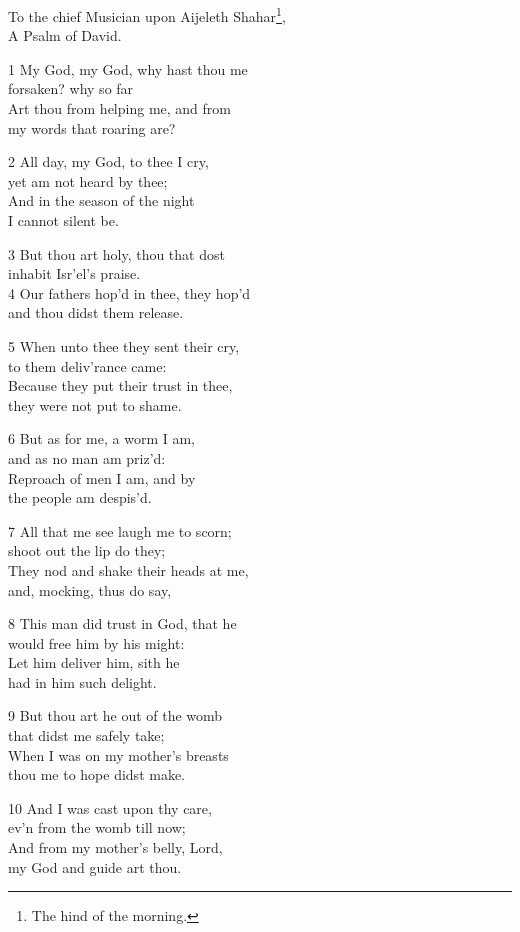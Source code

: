 To the chief Musician upon Aijeleth Shahar\footnote{The hind of the morning.},\\
A Psalm of David.

1 My God, my God, why hast thou me\\
forsaken? why so far\\
Art thou from helping me, and from\\
my words that roaring are?

2 All day, my God, to thee I cry,\\
yet am not heard by thee;\\
And in the season of the night\\
I cannot silent be.

3 But thou art holy, thou that dost\\
inhabit Isr’el’s praise.\\
4 Our fathers hop’d in thee, they hop’d\\
and thou didst them release.

5 When unto thee they sent their cry,\\
to them deliv’rance came:\\
Because they put their trust in thee,\\
they were not put to shame.

6 But as for me, a worm I am,\\
and as no man am priz’d:\\
Reproach of men I am, and by\\
the people am despis’d.

7 All that me see laugh me to scorn;\\
shoot out the lip do they;\\
They nod and shake their heads at me,\\
and, mocking, thus do say,

8 This man did trust in God, that he\\
would free him by his might:\\
Let him deliver him, sith he\\
had in him such delight.

9 But thou art he out of the womb\\
that didst me safely take;\\
When I was on my mother’s breasts\\
thou me to hope didst make.

10 And I was cast upon thy care,\\
ev’n from the womb till now;\\
And from my mother’s belly, Lord,\\
my God and guide art thou.

